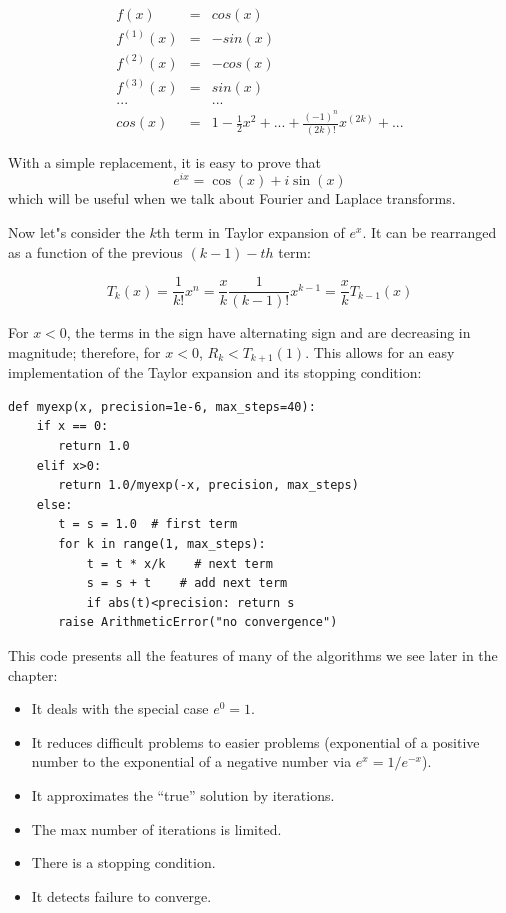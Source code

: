 \documentclass[justified, sixbynine]{tufte-book}
\def\ft{\small\tt}
\theoremstyle{plain}%
\newtheorem * {corollary}{Corollary}
\theoremstyle{definition}
\theoremstyle{remark}
\newtheorem * {remark}{Remark}
\newtheorem * {note}{Note}
\begin{document}
\begin{fullwidth}
\begin{eqnarray}
f(x) &=& cos(x) \\
f^{(1)}(x) &=& -sin(x) \\
f^{(2)}(x) &=& -cos(x) \\
f^{(3)}(x) &=& sin(x) \\
... && ... \\
cos(x) &=&  1 - \frac1{2}x^2 + ... + \frac{(-1)^n}{(2k)!}x^{(2k)} + ...
\end{eqnarray}

With a simple replacement, it is easy to prove that
\begin{equation}
e^{ix} = \cos(x) + i \sin(x)
\end{equation}
which will be useful when we talk about Fourier and Laplace transforms.

Now let"s consider the $k$th term in Taylor expansion of $e^x$. It can be rearranged as a function of the previous $(k-1)-th$ term:

\begin{equation}
T_k(x) = \frac1{k!}x^n = \frac{x}{k} \frac1{(k-1)!}x^{k-1} = \frac{x}{k} T_{k-1}(x)
\end{equation}

For $x<0$, the terms in the sign have alternating sign and are decreasing in magnitude; therefore, for $x<0$, $R_k<T_{k+1}(1)$. This allows for an easy implementation of the Taylor expansion and its stopping condition:

\begin{lstlisting}[caption={in file: {\ft nlib.py}}]
def myexp(x, precision=1e-6, max_steps=40):
    if x == 0:
       return 1.0
    elif x>0:
       return 1.0/myexp(-x, precision, max_steps)
    else:
       t = s = 1.0  # first term
       for k in range(1, max_steps):
           t = t * x/k    # next term
           s = s + t    # add next term
           if abs(t)<precision: return s
       raise ArithmeticError("no convergence")
\end{lstlisting}

This code presents all the features of many of the algorithms we see later in the chapter:
\begin{itemize}
\item It deals with the special case $e^0=1$.
\item It reduces difficult problems to easier problems (exponential of a positive number to the exponential of a negative number via $e^x = 1/e^{-x}$).
\item It approximates the ``true'' solution by iterations.
\item The max number of iterations is limited.
\item There is a stopping condition.
\item It detects failure to converge.
\end{itemize}


\end{fullwidth}
\end{document}

